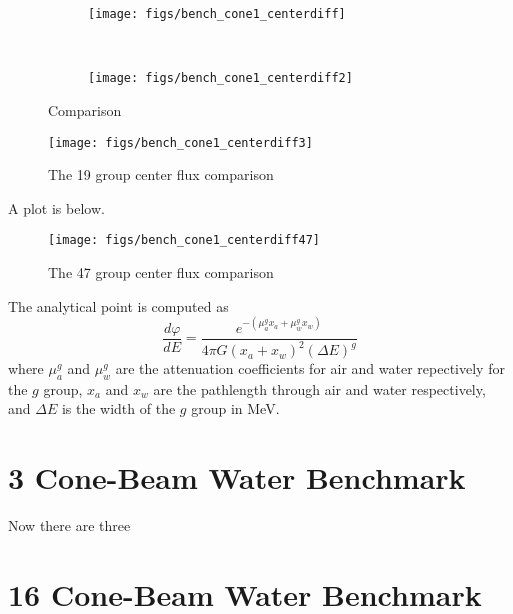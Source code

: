\begin{figure}
    \centering
    \begin{subfigure}[b]{0.45\textwidth}
        \texttt{[image: figs/bench\_cone1\_centerdiff]}
        \caption{}
        \label{fig:bench_cone1_centerdiff}
    \end{subfigure}
    ~
    \begin{subfigure}[b]{0.45\textwidth}
        \texttt{[image: figs/bench\_cone1\_centerdiff2]}
        \caption{}
        \label{fig:bench_cone1_centerdiff2}
    \end{subfigure}
    \caption{Comparison}\label{fig:bench_cone1_centerdifffig}
\end{figure}

\begin{figure}[tb]
  \begin{center}
   \texttt{[image: figs/bench\_cone1\_centerdiff3]}
  \end{center}
  \caption{The 19 group center flux comparison}
\label{fig:bench_cone1_centerdiff3}
\end{figure}

A plot is below.

\begin{figure}[tb]
  \begin{center}
   \texttt{[image: figs/bench\_cone1\_centerdiff47]}
  \end{center}
  \caption{The 47 group center flux comparison}
\label{fig:bench_cone1_centerdiff47}
\end{figure}

The analytical point is computed as
\begin{equation}
\frac{d\varphi}{dE} = \frac{e^{-(\mu^g_a x_a + \mu^g_w x_w)}}{4\pi G (x_a + x_w)^2 (\Delta E)^g}
\end{equation}
where $\mu_a^g$ and $\mu_w^g$ are the attenuation coefficients for air and water repectively for the $g$ group, $x_a$ and $x_w$ are the pathlength through air and water respectively, and $\Delta E$ is the width of the $g$ group in MeV.

\section{3 Cone-Beam Water Benchmark}

Now there are three

\section{16 Cone-Beam Water Benchmark}

